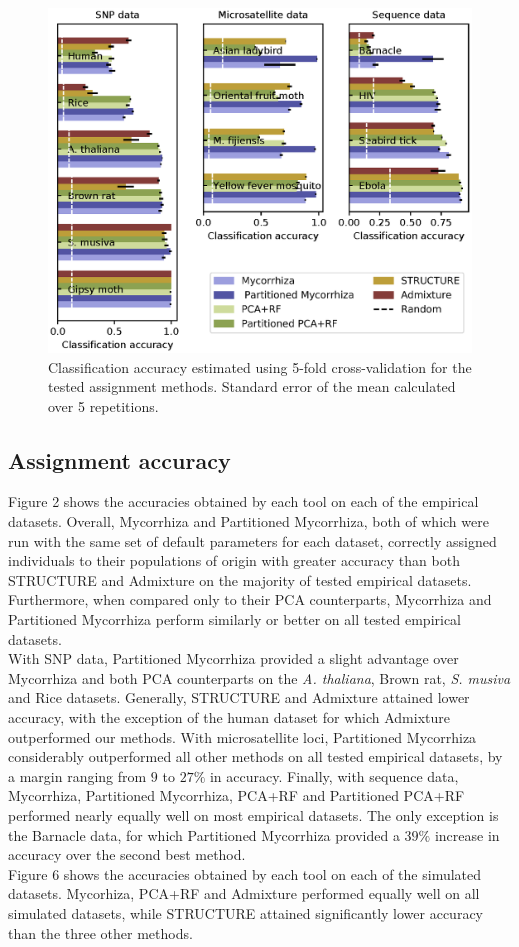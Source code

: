 \documentclass[final]{bioinfo}
\begin{document}
\begin{figure}[!tbp]%
    \includegraphics[width=\linewidth]{figure2.eps}
    \caption{Classification accuracy estimated using 5-fold cross-validation for the tested assignment methods. Standard error of the mean calculated over 5 repetitions.}\label{fig:02}
\end{figure}

\subsection{Assignment accuracy}
Figure 2 shows the accuracies obtained by each tool on each of the empirical datasets. Overall, Mycorrhiza and Partitioned Mycorrhiza, both of which were run with the same set of default parameters for each dataset, correctly assigned individuals to their populations of origin with greater accuracy than both STRUCTURE and Admixture on the majority of tested empirical datasets. Furthermore, when compared only to their PCA counterparts, Mycorrhiza and Partitioned Mycorrhiza perform similarly or better on all tested empirical datasets.\\
With SNP data, Partitioned Mycorrhiza provided a slight advantage over Mycorrhiza and both PCA counterparts on the \textit{A. thaliana}, Brown rat, \textit{S. musiva} and Rice datasets. Generally, STRUCTURE and Admixture attained lower accuracy, with the exception of the human dataset for which Admixture outperformed our methods. With microsatellite loci, Partitioned Mycorrhiza considerably outperformed all other methods on all tested empirical datasets, by a margin ranging from $9$ to $27\%$ in accuracy. Finally, with sequence data, Mycorrhiza, Partitioned Mycorrhiza, PCA+RF and Partitioned PCA+RF performed nearly equally well on most empirical datasets. The only exception is the Barnacle data, for which Partitioned Mycorrhiza provided a $39\%$ increase in accuracy over the second best method.\\
Figure 6 shows the accuracies obtained by each tool on each of the simulated datasets. Mycorhiza, PCA+RF and Admixture performed equally well on all simulated datasets, while STRUCTURE attained significantly lower accuracy than the three other methods.
\end{document}
